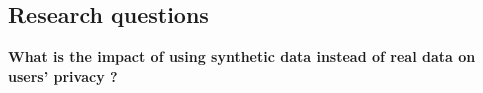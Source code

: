 \subsection{Research questions}
\textbf{What is the impact of using synthetic data instead of real data on users' privacy ?}
